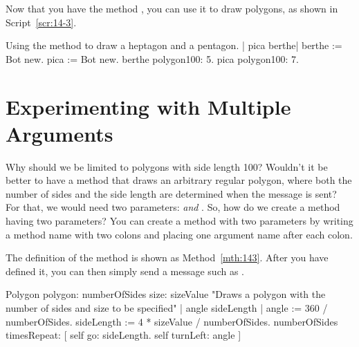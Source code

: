 \documentclass[a4paper,10pt,twoside]{book}
\begin{document}
Now that you have the method , you can use it to draw polygons, as shown in Script~\ref{scr:14-3}. 



\begin{script}[14-3]{Using the method  to draw a heptagon and a pentagon.}
| pica berthe| 
berthe := Bot new. 
pica := Bot new. 
berthe polygon100: 5. 
pica polygon100: 7.  
\end{script}


\section{Experimenting with Multiple Arguments}

Why should we be limited to polygons with side length 100? Wouldn’t it be better to have a 
method that draws an arbitrary regular polygon, where both the number of sides and the side 
length are determined when the message is sent? For that, we would need two parameters: 
 \emph{and} . So, how do we create a method having two parameters? You 
can create a method with two parameters by writing a method name with two colons and 
placing one argument name after each colon. 




The definition of the method  is shown as Method~\ref{mth:143}. After you have 
defined it, you can then simply send a message such as . 



\begin{method}[144]{Polygon}
polygon: numberOfSides size: sizeValue 
	"Draws a polygon with the number of sides and size to be specified" 
	| angle sideLength | 
	angle := 360 / numberOfSides. 
	sideLength := 4 * sizeValue / numberOfSides. 
	numberOfSides timesRepeat: 
		[ self go: sideLength. 
		self turnLeft: angle ] 
\end{method}
\end{document}
